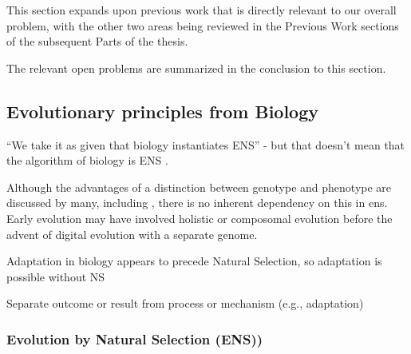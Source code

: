 This section expands upon previous work that is directly relevant to our overall problem, with the other two areas being reviewed in the Previous Work sections of the subsequent Parts of the thesis. 

The relevant open problems are summarized in the conclusion to this section.

\subsection{Evolutionary principles from Biology}


``We take it as given that biology instantiates ENS'' - but that doesn't mean that the algorithm of biology is ENS \autocite{Watson2012}.

Although the advantages of a distinction between genotype and phenotype are discussed by many, including \autocite[section 7.2.3]{Taylor1999}, there is no inherent dependency on this in \gls{ens}. Early evolution may have involved holistic or composomal evolution before the advent of digital evolution with a separate genome.

Adaptation in biology appears to precede Natural Selection, so adaptation is possible without NS \autocite{Watson2010}	      	      	



Separate outcome or result from process or mechanism (e.g., adaptation)

\subsubsection{Evolution by Natural Selection (ENS))}\label{ens-evolution-by-natural-selection}

